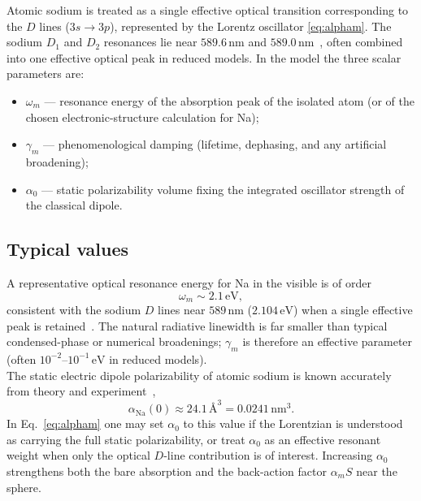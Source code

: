 \documentclass[11pt,a4paper]{article}
\begin{document}
Atomic sodium is treated as a single effective optical transition corresponding
to the $D$ lines ($3s\to 3p$), represented by the Lorentz oscillator
\eqref{eq:alpham}.  The sodium $D_1$ and $D_2$ resonances lie near
$589.6\,\mathrm{nm}$ and $589.0\,\mathrm{nm}$~\citep{nistasd}, often combined into one
effective optical peak in reduced models.  In the model the three scalar parameters are:
\begin{itemize}[leftmargin=1.4em]
  \item $\omega_m$ --- resonance energy of the absorption peak of the isolated
        atom (or of the chosen electronic-structure calculation for Na);
  \item $\gamma_m$ --- phenomenological damping (lifetime, dephasing, and any
        artificial broadening);
  \item $\alpha_0$ --- static polarizability volume fixing the integrated
        oscillator strength of the classical dipole.
\end{itemize}

\subsection{Typical values}

A representative optical resonance energy for Na in the visible is of order
\begin{equation}
  \omega_m \sim 2.1\,\mathrm{eV},
\end{equation}
consistent with the sodium $D$ lines near $589\,\mathrm{nm}$
($2.104\,\mathrm{eV}$) when a single effective peak is retained~\citep{nistasd}.  The natural
radiative linewidth is far smaller than typical condensed-phase or numerical
broadenings; $\gamma_m$ is therefore an effective parameter (often
$10^{-2}$--$10^{-1}\,\mathrm{eV}$ in reduced models).\\

\noindent
The static electric dipole polarizability of atomic sodium is known accurately
from theory and experiment~\citep{ekstrom1995,mitroy2010},
\begin{equation}
  \alpha_{\mathrm{Na}}(0)
  \approx
  24.1\,\text{\AA}^3
  =
  0.0241\,\mathrm{nm}^3.
\end{equation}
In Eq.~\eqref{eq:alpham} one may set $\alpha_0$ to this value if the Lorentzian
is understood as carrying the full static polarizability, or treat $\alpha_0$ as
an effective resonant weight when only the optical $D$-line contribution is of
interest.  Increasing $\alpha_0$ strengthens both the bare absorption and the
back-action factor $\alpha_m S$ near the sphere.
\end{document}
